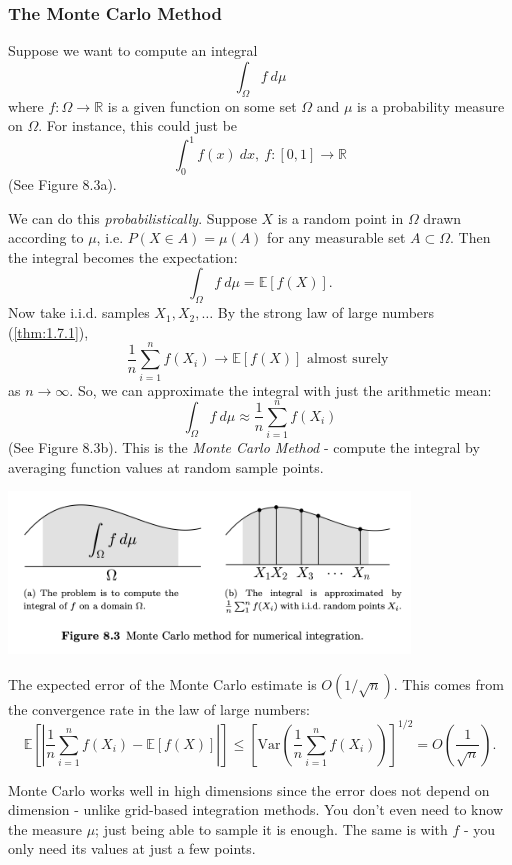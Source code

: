 \subsubsection{The Monte Carlo Method}
Suppose we want to compute an integral 
\[ \int_{\Omega}^{} f \ d \mu \]
where $f: \Omega \to \mathbb{R}$ is a given function on some set $\Omega$ and $\mu$ is a probability measure on 
$\Omega$. For instance, this could just be
\[ \int_{0}^{1} f(x) \ dx, \ f: [0, 1] \to \mathbb{R} \]
(See Figure 8.3a).

We can do this \textit{probabilistically}. Suppose $X$ is a random point in $\Omega$ drawn according to $\mu$, 
i.e. $P(X \in A) = \mu(A)$ for any measurable set $A \subset \Omega$. Then the integral becomes the expectation:
\[ \int_{\Omega}^{} f \ d \mu = \mathbb{E}\left[ f(X) \right]. \]
Now take i.i.d. samples $X_1, X_2, \dots$ By the strong law of large numbers (\cref{thm:1.7.1}),
\[ \frac{1}{n}\sum_{i = 1}^{n}f(X_i) \to \mathbb{E}\left[ f(X) \right] \text{ almost surely } \]
as $n \to \infty$. So, we can approximate the integral with just the arithmetic mean:
\[ \int_{\Omega}^{} f \ d \mu \approx \frac{1}{n}\sum_{i = 1}^{n}f(X_i) \]
(See Figure 8.3b). This is the \textit{Monte Carlo Method} - compute the integral by averaging function values 
at random sample points.

\begin{center}
	\includegraphics[width=0.8\textwidth]{Chapter 8/fig8-3.png}
\end{center}

\begin{remark}
\label{rmk:8.2.1}
The expected error of the Monte Carlo estimate is $O(1/\sqrt{n})$. This comes from the convergence rate in the 
law of large numbers:
\[ \mathbb{E}\left[ \left| \frac{1}{n}\sum_{i = 1}^{n}f(X_i) - \mathbb{E}\left[ f(X) \right] \right| \right] 
\leq \left[ \mathrm{Var}\left( \frac{1}{n}\sum_{i = 1}^{n}f(X_i) \right) \right]^{1/2} = 
O \left( \frac{1}{\sqrt{n}} \right). \]
\end{remark}

\begin{remark}
\label{rmk:8.2.2}
Monte Carlo works well in high dimensions since the error does not depend on dimension - unlike grid-based 
integration methods. You don't even need to know the measure $\mu$; just being able to sample it is enough. The 
same is with $f$ - you only need its values at just a few points.
\end{remark}


